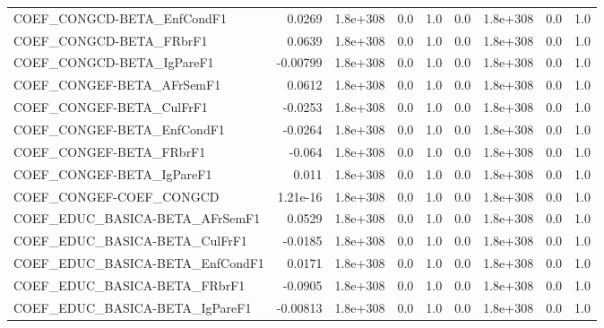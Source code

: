 \begin{tabular}{lrrrrrrrr}
COEF\_CONGCD-BETA\_EnfCondF1           &      0.0269 &     1.8e+308 &     0.0 &      1.0 &        0.0 &    1.8e+308 &          0.0 &           1.0 \\
COEF\_CONGCD-BETA\_FRbrF1              &      0.0639 &     1.8e+308 &     0.0 &      1.0 &        0.0 &    1.8e+308 &          0.0 &           1.0 \\
COEF\_CONGCD-BETA\_IgPareF1            &    -0.00799 &     1.8e+308 &     0.0 &      1.0 &        0.0 &    1.8e+308 &          0.0 &           1.0 \\
COEF\_CONGEF-BETA\_AFrSemF1            &      0.0612 &     1.8e+308 &     0.0 &      1.0 &        0.0 &    1.8e+308 &          0.0 &           1.0 \\
COEF\_CONGEF-BETA\_CulFrF1             &     -0.0253 &     1.8e+308 &     0.0 &      1.0 &        0.0 &    1.8e+308 &          0.0 &           1.0 \\
COEF\_CONGEF-BETA\_EnfCondF1           &     -0.0264 &     1.8e+308 &     0.0 &      1.0 &        0.0 &    1.8e+308 &          0.0 &           1.0 \\
COEF\_CONGEF-BETA\_FRbrF1              &      -0.064 &     1.8e+308 &     0.0 &      1.0 &        0.0 &    1.8e+308 &          0.0 &           1.0 \\
COEF\_CONGEF-BETA\_IgPareF1            &       0.011 &     1.8e+308 &     0.0 &      1.0 &        0.0 &    1.8e+308 &          0.0 &           1.0 \\
COEF\_CONGEF-COEF\_CONGCD              &    1.21e-16 &     1.8e+308 &     0.0 &      1.0 &        0.0 &    1.8e+308 &          0.0 &           1.0 \\
COEF\_EDUC\_BASICA-BETA\_AFrSemF1       &      0.0529 &     1.8e+308 &     0.0 &      1.0 &        0.0 &    1.8e+308 &          0.0 &           1.0 \\
COEF\_EDUC\_BASICA-BETA\_CulFrF1        &     -0.0185 &     1.8e+308 &     0.0 &      1.0 &        0.0 &    1.8e+308 &          0.0 &           1.0 \\
COEF\_EDUC\_BASICA-BETA\_EnfCondF1      &      0.0171 &     1.8e+308 &     0.0 &      1.0 &        0.0 &    1.8e+308 &          0.0 &           1.0 \\
COEF\_EDUC\_BASICA-BETA\_FRbrF1         &     -0.0905 &     1.8e+308 &     0.0 &      1.0 &        0.0 &    1.8e+308 &          0.0 &           1.0 \\
COEF\_EDUC\_BASICA-BETA\_IgPareF1       &    -0.00813 &     1.8e+308 &     0.0 &      1.0 &        0.0 &    1.8e+308 &          0.0 &           1.0 \\

\end{tabular}

